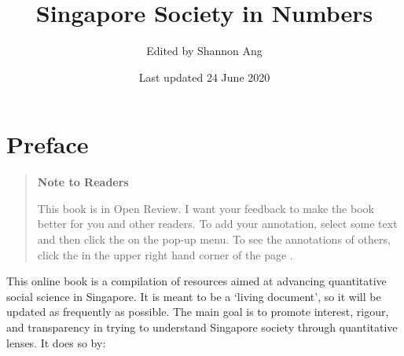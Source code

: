 \documentclass[
  openany]{book}
\title{Singapore Society in Numbers}
\author{Edited by Shannon Ang}
\date{Last updated 24 June 2020}
\begin{document}
\maketitle

{
\setcounter{tocdepth}{1}
\tableofcontents
}
\hypertarget{preface}{%
\chapter*{Preface}\label{preface}}

\begin{quote}
\textbf{Note to Readers}

This book is in Open Review. I want your feedback to make the book better for you and other readers. To add your annotation, {select some text} and then click the on the pop-up menu. To see the annotations of others, click the in the upper right hand corner of the page .
\end{quote}

This online book is a compilation of resources aimed at advancing quantitative social science in Singapore. It is meant to be a `living document', so it will be updated as frequently as possible. The main goal is to promote interest, rigour, and transparency in trying to understand Singapore society through quantitative lenses. It does so by:
\end{document}
